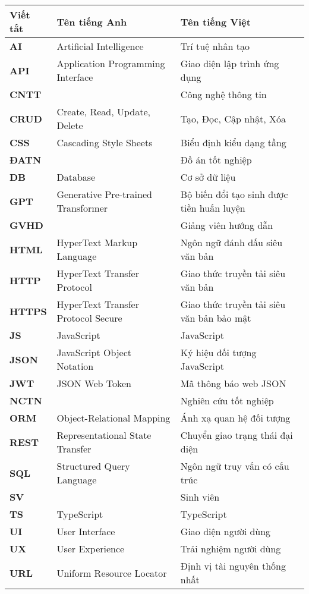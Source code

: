 \documentclass[../DoAn.tex]{subfiles}
\begin{document}
\begin{longtable}{l p{6cm} p{7cm}}
	\hline
   \textbf{Viết tắt}  & \textbf{Tên tiếng Anh}	& \textbf{Tên tiếng Việt} \\ \hline 
	\textbf{AI} & Artificial Intelligence & Trí tuệ nhân tạo\\
	\textbf{API} & Application Programming Interface & Giao diện lập trình ứng dụng\\
	\textbf{CNTT} &  & Công nghệ thông tin\\
	\textbf{CRUD} & Create, Read, Update, Delete & Tạo, Đọc, Cập nhật, Xóa\\
	\textbf{CSS} & Cascading Style Sheets & Biểu định kiểu dạng tầng\\
	\textbf{ĐATN} &  & Đồ án tốt nghiệp \\
	\textbf{DB} & Database & Cơ sở dữ liệu\\
	\textbf{GPT} & Generative Pre-trained Transformer & Bộ biến đổi tạo sinh được tiền huấn luyện\\
	\textbf{GVHD} &  & Giảng viên hướng dẫn\\
	\textbf{HTML} & HyperText Markup Language & Ngôn ngữ đánh dấu siêu văn bản\\
	\textbf{HTTP} & HyperText Transfer Protocol & Giao thức truyền tải siêu văn bản\\
	\textbf{HTTPS} & HyperText Transfer Protocol Secure & Giao thức truyền tải siêu văn bản bảo mật\\
	\textbf{JS} & JavaScript & JavaScript\\
	\textbf{JSON} & JavaScript Object Notation & Ký hiệu đối tượng JavaScript\\
	\textbf{JWT} & JSON Web Token & Mã thông báo web JSON\\
	\textbf{NCTN} &  & Nghiên cứu tốt nghiệp\\
	\textbf{ORM} & Object-Relational Mapping & Ánh xạ quan hệ đối tượng\\
	\textbf{REST} & Representational State Transfer & Chuyển giao trạng thái đại diện\\
	\textbf{SQL} & Structured Query Language & Ngôn ngữ truy vấn có cấu trúc\\
	\textbf{SV} &  & Sinh viên \\
	\textbf{TS} & TypeScript & TypeScript\\
	\textbf{UI} & User Interface & Giao diện người dùng\\
	\textbf{UX} & User Experience & Trải nghiệm người dùng\\
	\textbf{URL} & Uniform Resource Locator & Định vị tài nguyên thống nhất\\
    \hline
\end{longtable}
\end{document}
